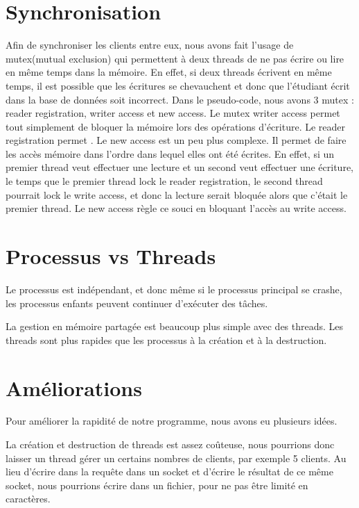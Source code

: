 \documentclass[utf8]{article}
\begin{document}
\section{Synchronisation}
\par
\indent

Afin de synchroniser les clients entre eux, nous avons fait l'usage de mutex(mutual exclusion) qui permettent 
à deux threads de ne pas écrire ou lire en même temps dans la mémoire.
En effet, si deux threads écrivent en même temps, il est possible que les écritures se chevauchent et donc que l'étudiant écrit dans la base de données soit incorrect.
\newline
Dans le pseudo-code, nous avons 3 mutex : reader registration, writer access et new access.
Le mutex writer access permet tout simplement de bloquer la mémoire lors des opérations d'écriture. Le reader registration permet .
Le new access est un peu plus complexe. Il permet de faire les accès mémoire dans l'ordre dans lequel elles ont été écrites.
En effet, si un premier thread veut effectuer une lecture et un second veut effectuer une écriture, le temps que le premier thread lock le reader registration, le second 
thread pourrait lock le write access, et donc la lecture serait bloquée alors que c'était le premier thread.
Le new access règle ce souci en bloquant l'accès au write access.
\par
\section{Processus vs Threads}
\par
\indent

Le processus est indépendant, et donc même si le processus principal se crashe, les processus enfants peuvent continuer d'exécuter des tâches.

La gestion en mémoire partagée est beaucoup plus simple avec des threads.
Les threads sont plus rapides que les processus à la création et à la destruction.

\par
\section{Améliorations}
\par
\indent

Pour améliorer la rapidité de notre programme, nous avons eu plusieurs idées.

La création et destruction de threads est assez coûteuse, nous pourrions donc laisser un thread gérer un certains nombres de clients, par exemple 5 clients.
Au lieu d'écrire dans la requête dans un socket et d'écrire le résultat de ce même socket, nous pourrions écrire dans un fichier, pour ne pas être limité en caractères.
\end{document}
